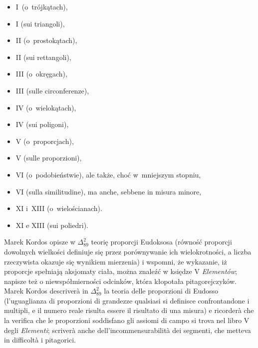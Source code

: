 \begin{itemize}
    \item I~(o~trójkątach), %
    \item I (sui triangoli), %
    \item II (o~prostokątach), %
    \item II (sui rettangoli), %
    \item III (o~okręgach), %
    \item III (sulle circonferenze), %
    \item IV (o~wielokątach), %
    \item IV (sui poligoni), %
    \item V (o~proporcjach), %
    \item V (sulle proporzioni), %
    \item VI (o~podobieństwie), ale także, choć w~mniejszym stopniu, %
    \item VI (sulla similitudine), ma anche, sebbene in misura minore, %
    \item XI i~XIII (o~wielościanach). %
    \item XI e XIII (sui poliedri). %
\end{itemize}

Marek Kordos opisze w $\Delta_{89}^{2}$ teorię proporcji Eudoksosa (równość proporcji dowolnych wielkości definiuje się przez porównywanie ich wielokrotności, a liczba rzeczywista okazuje się wynikiem mierzenia) i wspomni, że wykazanie, iż proporcje spełniają aksjomaty ciała, można znaleźć w księdze V \emph{Elementów}; napisze też o niewspółmierności odcinków, która kłopotała pitagorejczyków. %
Marek Kordos descriverà in $\Delta_{89}^{2}$ la teoria delle proporzioni di Eudosso (l'uguaglianza di proporzioni di grandezze qualsiasi si definisce confrontandone i multipli, e il numero reale risulta essere il risultato di una misura) e ricorderà che la verifica che le proporzioni soddisfano gli assiomi di campo si trova nel libro V degli \emph{Elementi}; scriverà anche dell'incommensurabilità dei segmenti, che metteva in difficoltà i pitagorici. %

